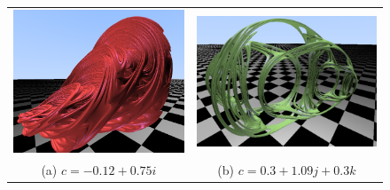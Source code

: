 \begin{figure}[ht]
    \centering
    \begin{tabular}{cc}
      \includegraphics[scale=0.28]{img/C8/julia-1.png} &     \includegraphics[scale=0.36]{img/C8/julia-2.png} \\
    (a) $c=-0.12+0.75 i$ & (b) $c=0.3+1.09j+0.3k$ \\[6pt]

\end{tabular}
\end{figure}
